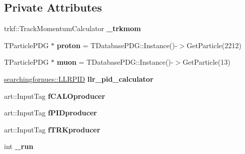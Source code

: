 \subsection*{Private Attributes}
\begin{DoxyCompactItemize}
\item 
trkf\+::\+Track\+Momentum\+Calculator {\bfseries \+\_\+trkmom}\hypertarget{classanalysis_1_1TrackAnalysis_aa69136b70c77e0f034fe009b86ba591b}{}\label{classanalysis_1_1TrackAnalysis_aa69136b70c77e0f034fe009b86ba591b}

\item 
T\+Particle\+P\+DG $\ast$ {\bfseries proton} = T\+Database\+P\+D\+G\+::\+Instance()-\/$>$Get\+Particle(2212)\hypertarget{classanalysis_1_1TrackAnalysis_a4adc7f89c334ab93747a8d4c4abbcc6d}{}\label{classanalysis_1_1TrackAnalysis_a4adc7f89c334ab93747a8d4c4abbcc6d}

\item 
T\+Particle\+P\+DG $\ast$ {\bfseries muon} = T\+Database\+P\+D\+G\+::\+Instance()-\/$>$Get\+Particle(13)\hypertarget{classanalysis_1_1TrackAnalysis_a0fe3b9e7864aaaa36b5f52826b4e3eb9}{}\label{classanalysis_1_1TrackAnalysis_a0fe3b9e7864aaaa36b5f52826b4e3eb9}

\item 
\hyperlink{classsearchingfornues_1_1LLRPID}{searchingfornues\+::\+L\+L\+R\+P\+ID} {\bfseries llr\+\_\+pid\+\_\+calculator}\hypertarget{classanalysis_1_1TrackAnalysis_a9aa071870faf165eb6548f0ea16e4132}{}\label{classanalysis_1_1TrackAnalysis_a9aa071870faf165eb6548f0ea16e4132}

\item 
art\+::\+Input\+Tag {\bfseries f\+C\+A\+L\+Oproducer}\hypertarget{classanalysis_1_1TrackAnalysis_a0ceaf940b041eda0237cc73cd330d18d}{}\label{classanalysis_1_1TrackAnalysis_a0ceaf940b041eda0237cc73cd330d18d}

\item 
art\+::\+Input\+Tag {\bfseries f\+P\+I\+Dproducer}\hypertarget{classanalysis_1_1TrackAnalysis_a349dc117e508190c619cd9f47ea7647e}{}\label{classanalysis_1_1TrackAnalysis_a349dc117e508190c619cd9f47ea7647e}

\item 
art\+::\+Input\+Tag {\bfseries f\+T\+R\+Kproducer}\hypertarget{classanalysis_1_1TrackAnalysis_a45abdcf3140e68a2ce90501e33a00eb3}{}\label{classanalysis_1_1TrackAnalysis_a45abdcf3140e68a2ce90501e33a00eb3}

\item 
int {\bfseries \+\_\+run}\hypertarget{classanalysis_1_1TrackAnalysis_aa9a9d585543f931ac8b736f39a7dc4a5}{}\label{classanalysis_1_1TrackAnalysis_aa9a9d585543f931ac8b736f39a7dc4a5}


\end{DoxyCompactItemize}
